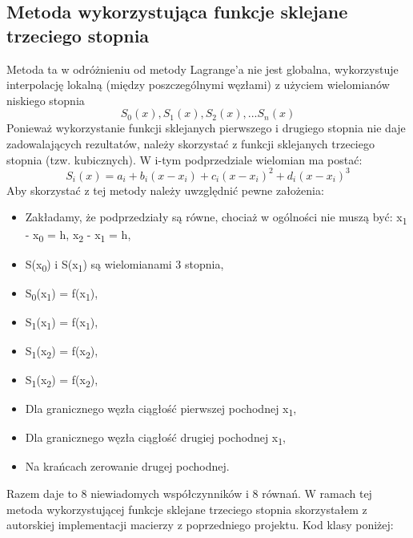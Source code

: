 \documentclass{article}
\begin{document}
\newpage

\subsection{Metoda wykorzystująca funkcje sklejane trzeciego stopnia}

Metoda ta w odróżnieniu od metody Lagrange'a nie jest globalna, wykorzystuje interpolację lokalną (między poszczególnymi węzłami) z użyciem wielomianów niskiego stopnia \[S_0(x), S_1(x), S_2(x), ... S_n(x)\]
Ponieważ wykorzystanie funkcji sklejanych pierwszego i drugiego stopnia nie daje zadowalających rezultatów, należy
skorzystać z funkcji sklejanych trzeciego stopnia (tzw. kubicznych). W i-tym podprzedziale wielomian ma postać:
\[ S_i(x) = a_i + b_i(x-x_i) + c_i(x-x_i)^2 + d_i(x-x_i)^3 \]
Aby skorzystać z tej metody należy uwzględnić pewne założenia:
\begin{itemize}
    \item Zakładamy, że podprzedziały są równe, chociaż w ogólności nie muszą być: \break
        x\textsubscript{1} - x\textsubscript{0} = h, x\textsubscript{2} - x\textsubscript{1} = h,
    \item S(x\textsubscript{0}) i S(x\textsubscript{1}) są wielomianami 3 stopnia,
    \item S\textsubscript{0}(x\textsubscript{1}) = f(x\textsubscript{1}),
    \item S\textsubscript{1}(x\textsubscript{1}) = f(x\textsubscript{1}),
    \item S\textsubscript{1}(x\textsubscript{2}) = f(x\textsubscript{2}),
    \item S\textsubscript{1}(x\textsubscript{2}) = f(x\textsubscript{2}),
    \item Dla granicznego węzła ciągłość pierwszej pochodnej x\textsubscript{1},
    \item Dla granicznego węzła ciągłość drugiej pochodnej x\textsubscript{1},
    \item Na krańcach zerowanie drugej pochodnej.
\end{itemize}
Razem daje to 8 niewiadomych współczynników i 8 równań.
W ramach tej metoda wykorzystującej funkcje sklejane trzeciego stopnia skorzystałem z autorskiej implementacji macierzy z poprzedniego projektu. Kod klasy poniżej:
\end{document}
